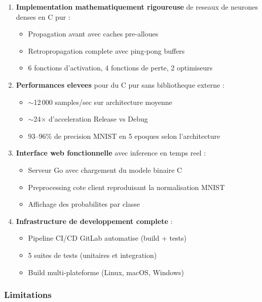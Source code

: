 \documentclass[
  letterpaper,
  DIV=11,
  numbers=noendperiod]{scrartcl}
\providecommand{\tightlist}{%
  \setlength{\itemsep}{0pt}\setlength{\parskip}{0pt}}
\begin{document}
\begin{enumerate}
\def\labelenumi{\arabic{enumi}.}
\tightlist
\item
  \textbf{Implementation mathematiquement rigoureuse} de reseaux de neurones denses en C pur :
  \begin{itemize}
  \tightlist
  \item Propagation avant avec caches pre-alloues
  \item Retropropagation complete avec ping-pong buffers
  \item 6 fonctions d'activation, 4 fonctions de perte, 2 optimiseurs
  \end{itemize}
\item
  \textbf{Performances elevees} pour du C pur sans bibliotheque externe :
  \begin{itemize}
  \tightlist
  \item $\sim$12\,000 samples/sec sur architecture moyenne
  \item $\sim$24$\times$ d'acceleration Release vs Debug
  \item 93--96\% de precision MNIST en 5 epoques selon l'architecture
  \end{itemize}
\item
  \textbf{Interface web fonctionnelle} avec inference en temps reel :
  \begin{itemize}
  \tightlist
  \item Serveur Go avec chargement du modele binaire C
  \item Preprocessing cote client reproduisant la normalisation MNIST
  \item Affichage des probabilites par classe
  \end{itemize}
\item
  \textbf{Infrastructure de developpement complete} :
  \begin{itemize}
  \tightlist
  \item Pipeline CI/CD GitLab automatise (build + tests)
  \item 5 suites de tests (unitaires et integration)
  \item Build multi-plateforme (Linux, macOS, Windows)
  \end{itemize}
\end{enumerate}

\subsubsection{Limitations}\label{limitations}
\end{document}
